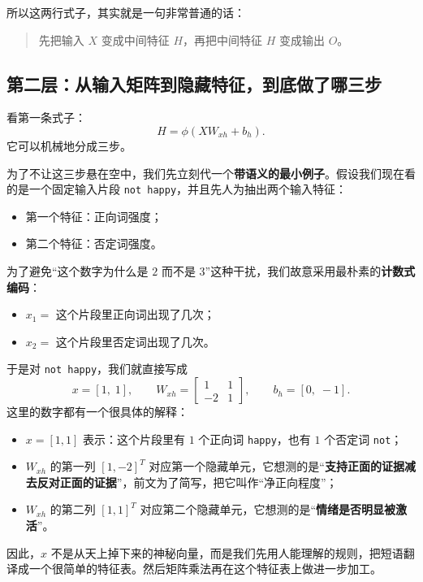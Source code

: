 \documentclass[12pt,a4paper]{ctexart}
\begin{document}
所以这两行式子，其实就是一句非常普通的话：
\begin{quote}
先把输入 \(X\) 变成中间特征 \(H\)，再把中间特征 \(H\) 变成输出 \(O\)。
\end{quote}

\subsection{第二层：从输入矩阵到隐藏特征，到底做了哪三步}

看第一条式子：
\[
H = \phi(XW_{xh} + b_h).
\]
它可以机械地分成三步。

为了不让这三步悬在空中，我们先立刻代一个\textbf{带语义的最小例子}。假设我们现在看的是一个固定输入片段 \texttt{not happy}，并且先人为抽出两个输入特征：
\begin{itemize}
  \item 第一个特征：正向词强度；
  \item 第二个特征：否定词强度。
\end{itemize}

为了避免“这个数字为什么是 \(2\) 而不是 \(3\)”这种干扰，我们故意采用最朴素的\textbf{计数式编码}：
\begin{itemize}
  \item \(x_1 =\) 这个片段里正向词出现了几次；
  \item \(x_2 =\) 这个片段里否定词出现了几次。
\end{itemize}

于是对 \texttt{not happy}，我们就直接写成
\[
x = [1,\;1], \qquad
W_{xh} =
\begin{bmatrix}
1 & 1\\
-2 & 1
\end{bmatrix},
\qquad
b_h = [0,\;-1].
\]
这里的数字都有一个很具体的解释：
\begin{itemize}
  \item \(x=[1,1]\) 表示：这个片段里有 \(1\) 个正向词 \texttt{happy}，也有 \(1\) 个否定词 \texttt{not}；
  \item \(W_{xh}\) 的第一列 \([1,-2]^T\) 对应第一个隐藏单元，它想测的是“\textbf{支持正面的证据减去反对正面的证据}”，前文为了简写，把它叫作“净正向程度”；
  \item \(W_{xh}\) 的第二列 \([1,1]^T\) 对应第二个隐藏单元，它想测的是“\textbf{情绪是否明显被激活}”。
\end{itemize}

因此，\(x\) 不是从天上掉下来的神秘向量，而是我们先用人能理解的规则，把短语翻译成一个很简单的特征表。然后矩阵乘法再在这个特征表上做进一步加工。
\end{document}
